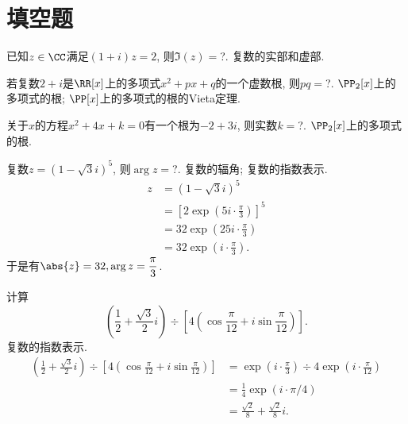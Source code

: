 \documentclass[8pt]{article}
\author{\Author}
\title{\Title}
\date{}
\begin{document}
	\maketitle

	\tableofcontents

	\section{填空题}
	
		\begin{easonproblem}
			已知\(z \in \CC\)满足\((1+i)z=2\), 则\(\Im (z) = \)?.
			\subproblem
			 复数的实部和虚部.
		\end{easonproblem}

		\begin{easonproblem}
			若复数\(2+i\)是\(\RR[x]\)上的多项式\(x^2+px+q\)的一个虚数根, 则\(pq = \)?.
			\subproblem
			 \(\PP_2[x]\)上的多项式的根; \(\PP[x]\)上的多项式的根的Vieta定理.
		\end{easonproblem}

		\begin{easonproblem}
			关于\(x\)的方程\(x^2 + 4x + k = 0\)有一个根为\(-2 + 3i\), 则实数\(k = \)?.
			\subproblem
			 \(\PP_2[x]\)上的多项式的根.
		\end{easonproblem}

		\begin{easonbigproblem}
			复数\(z = \left(1-\sqrt{3}i\right)^5\), 则\(\arg z = \)?.
			\subbigproblem
			 复数的辐角; 复数的指数表示.
			\begin{align}
				z   &=	\left(1 - \sqrt{3}i\right)^5 \\
					&=	\left[2 \exp \left(5 i \cdot \frac{\pi}{3}\right)\right]^5\\
					&=	32 \exp \left(25 i \cdot \frac{\pi}{3}\right)\\
					&=	32 \exp \left(i \cdot \frac{\pi}{3}\right).
			\end{align}
			于是有\(\abs{z} = 32, \arg z = \displaystyle \frac{\pi}{3}\).
		\end{easonbigproblem}

		\begin{easonbigproblem}
			计算
			\begin{displaymath}
				\left(\frac{1}{2} + \frac{\sqrt{3}}{2} i\right) \div \left[4 \left(\cos \frac{\pi}{12} + i \sin \frac{\pi}{12}\right)\right].
			\end{displaymath}
			\subbigproblem
			 复数的指数表示.
			\begin{align}
				\left(\frac{1}{2} + \frac{\sqrt{3}}{2} i\right) \div \left[4 \left(\cos \frac{\pi}{12} + i \sin \frac{\pi}{12}\right)\right]	&=	\exp \left(i \cdot \frac{\pi}{3}\right) \div 4\exp \left(i \cdot  \frac{\pi}{12}\right)\\
				&= \frac{1}{4} \exp \left(i \cdot \pi / 4\right)\\
				&= \frac{\sqrt{2}}{8} + \frac{\sqrt{2}}{8}i.
			\end{align}
		\end{easonbigproblem}
\end{document}
